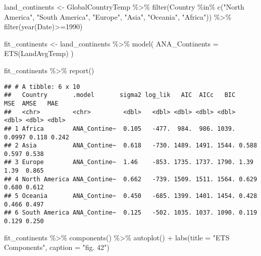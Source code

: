 \documentclass[
]{article}
\newenvironment{Shaded}{\begin{snugshade}}{\end{snugshade}}
\newcommand{\AttributeTok}[1]{\textcolor[rgb]{0.77,0.63,0.00}{#1}}
\newcommand{\DecValTok}[1]{\textcolor[rgb]{0.00,0.00,0.81}{#1}}
\newcommand{\FunctionTok}[1]{\textcolor[rgb]{0.00,0.00,0.00}{#1}}
\newcommand{\NormalTok}[1]{#1}
\newcommand{\OtherTok}[1]{\textcolor[rgb]{0.56,0.35,0.01}{#1}}
\newcommand{\SpecialCharTok}[1]{\textcolor[rgb]{0.00,0.00,0.00}{#1}}
\newcommand{\StringTok}[1]{\textcolor[rgb]{0.31,0.60,0.02}{#1}}
\begin{document}
\begin{Shaded}
\begin{Highlighting}[]
\NormalTok{land\_continents }\OtherTok{\textless{}{-}} 
\NormalTok{  GlobalCountryTemp }\SpecialCharTok{\%\textgreater{}\%} 
  \FunctionTok{filter}\NormalTok{(Country }\SpecialCharTok{\%in\%} \FunctionTok{c}\NormalTok{(}\StringTok{"North America"}\NormalTok{, }\StringTok{"South America"}\NormalTok{, }\StringTok{"Europe"}\NormalTok{, }\StringTok{"Asia"}\NormalTok{, }\StringTok{"Oceania"}\NormalTok{, }\StringTok{"Africa"}\NormalTok{)) }\SpecialCharTok{\%\textgreater{}\%} 
  \FunctionTok{filter}\NormalTok{(}\FunctionTok{year}\NormalTok{(Date)}\SpecialCharTok{\textgreater{}=}\DecValTok{1990}\NormalTok{)}

\NormalTok{fit\_continents }\OtherTok{\textless{}{-}}\NormalTok{ land\_continents }\SpecialCharTok{\%\textgreater{}\%} 
  \FunctionTok{model}\NormalTok{(}
    \AttributeTok{ANA\_Continents =} \FunctionTok{ETS}\NormalTok{(LandAvgTemp)}
\NormalTok{  )}

\NormalTok{fit\_continents }\SpecialCharTok{\%\textgreater{}\%} \FunctionTok{report}\NormalTok{()}
\end{Highlighting}
\end{Shaded}

\begin{verbatim}
## # A tibble: 6 x 10
##   Country       .model       sigma2 log_lik   AIC  AICc   BIC    MSE  AMSE   MAE
##   <chr>         <chr>         <dbl>   <dbl> <dbl> <dbl> <dbl>  <dbl> <dbl> <dbl>
## 1 Africa        ANA_Contine~  0.105   -477.  984.  986. 1039. 0.0997 0.118 0.242
## 2 Asia          ANA_Contine~  0.618   -730. 1489. 1491. 1544. 0.588  0.597 0.538
## 3 Europe        ANA_Contine~  1.46    -853. 1735. 1737. 1790. 1.39   1.39  0.865
## 4 North America ANA_Contine~  0.662   -739. 1509. 1511. 1564. 0.629  0.680 0.612
## 5 Oceania       ANA_Contine~  0.450   -685. 1399. 1401. 1454. 0.428  0.466 0.497
## 6 South America ANA_Contine~  0.125   -502. 1035. 1037. 1090. 0.119  0.129 0.250
\end{verbatim}

\begin{Shaded}
\begin{Highlighting}[]
\NormalTok{fit\_continents }\SpecialCharTok{\%\textgreater{}\%} 
  \FunctionTok{components}\NormalTok{() }\SpecialCharTok{\%\textgreater{}\%} 
  \FunctionTok{autoplot}\NormalTok{() }\SpecialCharTok{+} \FunctionTok{labs}\NormalTok{(}\AttributeTok{title =} \StringTok{"ETS Components"}\NormalTok{, }\AttributeTok{caption =} \StringTok{"fig. 42"}\NormalTok{)}
\end{Highlighting}
\end{Shaded}
\end{document}
